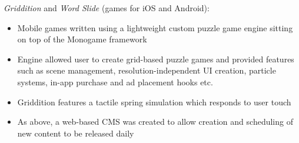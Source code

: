 \item \emph{Griddition} and \emph{Word Slide} (games for iOS and Android):
\begin{itemize}%
    \item Mobile games written using a lightweight custom puzzle game engine sitting on top of the Monogame framework
    \item Engine allowed user to create grid-based puzzle games and provided features such as scene management, resolution-independent UI creation, particle systems, in-app purchase and ad placement hooks etc.
    \item Griddition features a tactile spring simulation which responds to user touch
    \item As above, a web-based CMS was created to allow creation and scheduling of new content to be released daily
\end{itemize}
